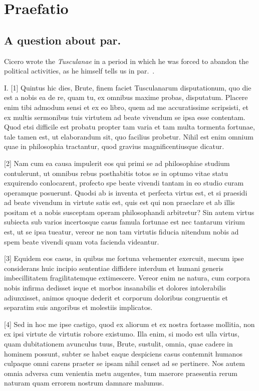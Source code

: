 \documentclass[11pt,b5paper,twoside]{book}
\begin{document}
\chapter*{Praefatio}
\section{A question about par.~}

Cicero wrote the \textit{Tusculanae} in a period in which he was forced to abandon the political activities, as he himself tells us in par.~.

I. [1] Quintus hic dies, Brute, finem faciet Tusculanarum disputationum, quo die est a nobis ea de re, quam tu, ex omnibus maxime probas, disputatum. Placere enim tibi admodum sensi et ex eo libro, quem ad me accuratissime scripsisti, et ex multis sermonibus tuis virtutem ad beate vivendum se ipsa esse contentam. Quod etsi difficile est probatu propter tam varia et tam multa tormenta fortunae, tale tamen est, ut elaborandum sit, quo facilius probetur. Nihil est enim omnium quae in philosophia tractantur, quod gravius magnificentiusque dicatur.

[2] Nam cum ea causa impulerit eos qui primi se ad philosophiae studium contulerunt, ut omnibus rebus posthabitis totos se in optumo vitae statu exquirendo conlocarent, profecto spe beate vivendi tantam in eo studio curam operamque posuerunt. Quodsi ab is inventa et perfecta virtus est, et si praesidi ad beate vivendum in virtute satis est, quis est qui non praeclare et ab illis positam et a nobis susceptam operam philosophandi arbitretur? Sin autem virtus subiecta sub varios incertosque casus famula fortunae est nec tantarum virium est, ut se ipsa tueatur, vereor ne non tam virtutis fiducia nitendum nobis ad spem beate vivendi quam vota facienda videantur.

[3] Equidem eos casus, in quibus me fortuna vehementer exercuit, mecum ipse considerans huic incipio sententiae diffidere interdum et humani generis imbecillitatem fragilitatemque extimescere. Vereor enim ne natura, cum corpora nobis infirma dedisset isque et morbos insanabilis et dolores intolerabilis adiunxisset, animos quoque dederit et corporum doloribus congruentis et separatim suis angoribus et molestiis implicatos.

[4] Sed in hoc me ipse castigo, quod ex aliorum et ex nostra fortasse mollitia, non ex ipsi virtute de virtutis robore existumo. Illa enim, si modo est ulla virtus, quam dubitationem avunculus tuus, Brute, sustulit, omnia, quae cadere in hominem possunt, subter se habet eaque despiciens casus contemnit humanos culpaque omni carens praeter se ipsam nihil censet ad se pertinere. Nos autem omnia adversa cum venientia metu augentes, tum maerore praesentia rerum naturam quam errorem nostrum damnare malumus.
\end{document}
